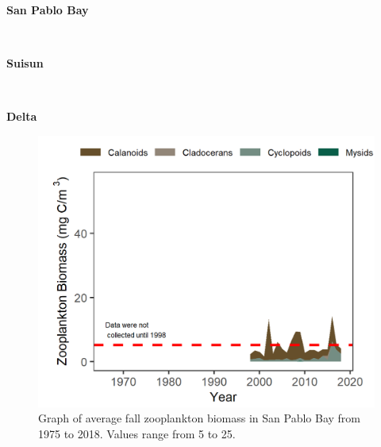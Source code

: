 \documentclass[
]{book}
\begin{document}
\begin{panel-grid}

\begin{columns-nocenter}

\begin{column800}

\textbf{San Pablo Bay}

\end{column800}

\begin{column40}

~

\end{column40}

\begin{column800}

\textbf{Suisun}

\end{column800}

\begin{column40}

~

\end{column40}

\begin{column800}

\textbf{Delta}

\end{column800}

\end{columns-nocenter}

\begin{columns-nocenter}

\begin{column800}

\begin{expand}

\begin{figure}
\includegraphics[width=15.25in]{figures/zoops_splfall} \caption{Graph of average fall zooplankton biomass in San Pablo Bay from 1975 to 2018. Values range from 5 to 25.}\label{fig:unnamed-chunk-115}
\end{figure}


\end{expand}
\end{column800}
\end{columns-nocenter}
\end{panel-grid}
\end{document}
